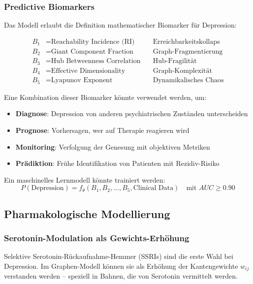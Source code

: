 \documentclass[a4paper,12pt]{article}
\theoremstyle{definition}
\begin{document}
\subsubsection{Predictive Biomarkers}

Das Modell erlaubt die Definition mathematischer Biomarker für Depression:

\begin{align}
B_1 &= \text{Reachability Incidence (RI)} \quad &\text{Erreichbarkeitskollaps} \\
B_2 &= \text{Giant Component Fraction} \quad &\text{Graph-Fragmentierung} \\
B_3 &= \text{Hub Betweenness Correlation} \quad &\text{Hub-Fragilität} \\
B_4 &= \text{Effective Dimensionality} \quad &\text{Graph-Komplexität} \\
B_5 &= \text{Lyapunov Exponent} \quad &\text{Dynamikalisches Chaos}
\end{align}

Eine Kombination dieser Biomarker könnte verwendet werden, um:
\begin{itemize}
	\item \textbf{Diagnose}: Depression von anderen psychiatrischen Zuständen unterscheiden
	\item \textbf{Prognose}: Vorhersagen, wer auf Therapie reagieren wird
	\item \textbf{Monitoring}: Verfolgung der Genesung mit objektiven Metriken
	\item \textbf{Prädiktion}: Frühe Identifikation von Patienten mit Rezidiv-Risiko
\end{itemize}

Ein maschinelles Lernmodell könnte trainiert werden:
\[
P(\text{Depression}) = f_{\theta}(B_1, B_2, \ldots, B_5, \text{Clinical Data}) \quad \text{mit } AUC \geq 0.90
\]

\subsection{Pharmakologische Modellierung}

\subsubsection{Serotonin-Modulation als Gewichts-Erhöhung}

Selektive Serotonin-Rückaufnahme-Hemmer (SSRIs) sind die erste Wahl bei Depression. Im Graphen-Modell können sie als Erhöhung der Kantengewichte $w_{ij}$ verstanden werden -- speziell in Bahnen, die von Serotonin vermittelt werden.
\end{document}
